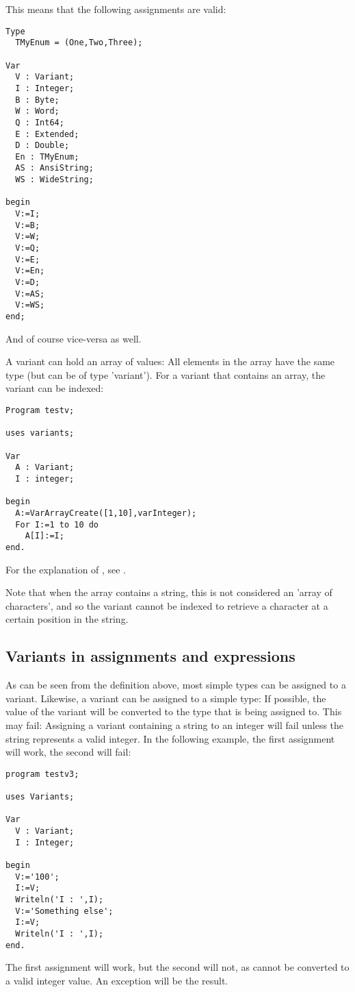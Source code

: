 This means that the following assignments are valid:
\begin{verbatim}
Type
  TMyEnum = (One,Two,Three);

Var
  V : Variant;
  I : Integer;
  B : Byte;
  W : Word;
  Q : Int64;
  E : Extended;
  D : Double;
  En : TMyEnum;
  AS : AnsiString;
  WS : WideString;

begin
  V:=I;
  V:=B;
  V:=W;
  V:=Q;
  V:=E;
  V:=En;
  V:=D;
  V:=AS;
  V:=WS;
end;
\end{verbatim}
And of course vice-versa as well.

A variant can hold an array of values: All elements in the array have
the same type (but can be of type 'variant'). For a variant 
that contains an array, the variant can be indexed:
\begin{verbatim}
Program testv;

uses variants;

Var
  A : Variant;
  I : integer;

begin
  A:=VarArrayCreate([1,10],varInteger);
  For I:=1 to 10 do
    A[I]:=I;
end.
\end{verbatim}
For the explanation of , see \unitsref.

Note that when the array contains a string, this is not considered an 'array
of characters', and so the variant cannot be indexed to retrieve a character
at a certain position in the string.


\subsection{Variants in assignments and expressions}
As can be seen from the definition above, most simple types can be assigned
to a variant. Likewise, a variant can be assigned to a simple type: If
possible, the value of the variant will be converted to the type that is
being assigned to. This may fail: Assigning a variant containing a string 
to an integer will fail unless the string represents a valid integer. In the
following example, the first assignment will work, the second will fail:
\begin{verbatim}
program testv3;

uses Variants;

Var
  V : Variant;
  I : Integer;

begin
  V:='100';
  I:=V;
  Writeln('I : ',I);
  V:='Something else';
  I:=V;
  Writeln('I : ',I);
end.
\end{verbatim}
The first assignment will work, but the second will not, as 
cannot be converted to a valid integer value. An  exception 
will be the result.

